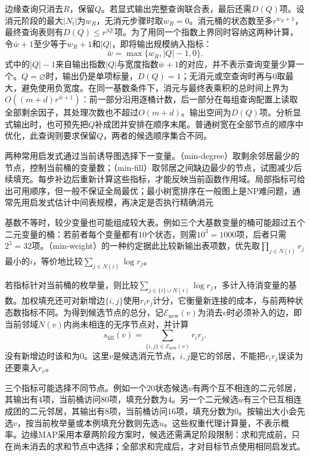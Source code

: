 边缘查询只消去$R$，保留$Q$。若显式输出完整查询联合表，最后还需$D(Q)$项。设消元阶段的最大$|N_t|$为$w_R$，无消元步骤时取$w_R=0$。消元桶的状态数至多$r^{w_R+1}$，最终查询表则有$D(Q)\leq r^{|Q|}$项。为了用同一个指数上界同时容纳这两种计算，令$\bar w+1$至少等于$w_R+1$和$|Q|$，即将输出规模纳入指标：
\[
  \bar w=\max\{w_R,|Q|-1,0\}.
\]
式中的$|Q|-1$来自输出指数$|Q|$与宽度指数$\bar w+1$的对应，并不表示查询变量少算一个。$Q=\varnothing$时，输出仍是单项标量，$D(Q)=1$；无消元或空查询时再与$0$取最大，避免使用负宽度。在同一基数条件下，消元与最终表乘积的总时间上界为$O((m+d)r^{\bar w+1})$：前一部分沿用逐桶计数，后一部分在每组查询配置上读取全部剩余因子，其处理次数也不超过$O(m+d)$。输出空间为$D(Q)$项。分析显式输出时，也可预先把$Q$补成团并安排在顺序末尾。普通树宽在全部节点的顺序中优化，此查询则要求保留$Q$，两者的候选顺序集合不同。

两种常用启发式通过当前诱导图选择下一变量。（min-degree）取剩余邻居最少的节点，控制当前桶的变量数；（min-fill）取邻居之间缺边最少的节点，试图减少后续填充。每步补边后重新计算这些指标，才能反映当前函数作用域。局部指标可给出可用顺序，但一般不保证全局最优；最小树宽排序在一般图上是NP难问题，通常先用启发式估计中间表规模，再决定是否执行精确消元

基数不等时，较少变量也可能组成较大表。例如三个大基数变量的桶可能超过五个二元变量的桶：若前者每个变量都有$10$个状态，则需$10^3=1000$项，后者只需$2^5=32$项。（min-weight）的一种约定据此比较新输出表项数，优先取$\prod_{j\in N(i)}r_j$最小的$i$，等价地比较$\sum_{j\in N(i)}\log r_j$。

若指标针对当前桶的枚举量，则比较$\sum_{j\in\{i\}\cup N(i)}\log r_j$，多计入待消变量的基数。加权填充还可对新增边$\{i,j\}$使用$r_ir_j$计分，它衡量新连接的成本，与前两种状态数指标不同。为得到候选节点的总分，记$\mathcal{E}_{\mathrm{new}}(v)$为消去$v$时必须补入的边，即当前邻域$N(v)$内尚未相连的无序节点对，并计算
\[
  s_{\mathrm{fill}}(v)
  =\sum_{\{i,j\}\in\mathcal{E}_{\mathrm{new}}(v)}r_ir_j.
\]
没有新增边时该和为$0$。这里$v$是候选消元节点，$i,j$是它的邻居，不能把$r_ir_j$误读为还要乘入$r_v$。

三个指标可能选择不同节点。例如一个$20$状态候选$v$有两个互不相连的二元邻居，其输出有$4$项，当前桶访问$80$项，填充分数为$4$。另一个二元候选$u$有三个已互相连成团的二元邻居，其输出有$8$项，当前桶访问$16$项，填充分数为$0$。按输出大小会先选$v$，按当前枚举量或本例填充分数则先选$u$。这些权重代理计算量，不表示概率。边缘MAP采用本章两阶段方案时，候选还需满足阶段限制：求和完成前，只在尚未消去的求和节点中选择；全部求和完成后，才对目标节点使用相同启发式。


